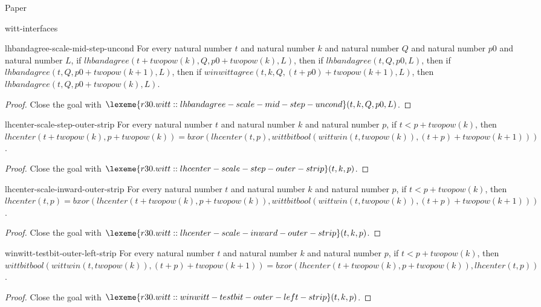 \begin{lexlean}{Paper}
\begin{section}{witt-interfaces}
  \begin{theorem}{lhbandagree-scale-mid-step-uncond}
  For every natural number \(t\) and natural number \(k\) and natural number \(Q\) and natural number \(p0\) and natural number \(L\), if \(lhbandagree(t + twopow(k), Q, p0 + twopow(k), L)\), then if \(lhbandagree(t, Q, p0, L)\), then if \(lhbandagree(t, Q, p0 + twopow(k + 1), L)\), then if \(winwittagree(t, k, Q, (t + p0) + twopow(k + 1), L)\), then \(lhbandagree(t, Q, p0 + twopow(k), L)\).
  \begin{proof}
  Close the goal with \(\lexeme{r30.witt::lhbandagree-scale-mid-step-uncond}(t, k, Q, p0, L)\).
  \end{proof}
  \end{theorem}

  \begin{theorem}{lhcenter-scale-step-outer-strip}
  For every natural number \(t\) and natural number \(k\) and natural number \(p\), if \(t < p + twopow(k)\), then \(lhcenter(t + twopow(k), p + twopow(k)) = bxor(lhcenter(t, p), wittbitbool(wittwin(t, twopow(k)), (t + p) + twopow(k + 1)))\).
  \begin{proof}
  Close the goal with \(\lexeme{r30.witt::lhcenter-scale-step-outer-strip}(t, k, p)\).
  \end{proof}
  \end{theorem}

  \begin{theorem}{lhcenter-scale-inward-outer-strip}
  For every natural number \(t\) and natural number \(k\) and natural number \(p\), if \(t < p + twopow(k)\), then \(lhcenter(t, p) = bxor(lhcenter(t + twopow(k), p + twopow(k)), wittbitbool(wittwin(t, twopow(k)), (t + p) + twopow(k + 1)))\).
  \begin{proof}
  Close the goal with \(\lexeme{r30.witt::lhcenter-scale-inward-outer-strip}(t, k, p)\).
  \end{proof}
  \end{theorem}

  \begin{theorem}{winwitt-testbit-outer-left-strip}
  For every natural number \(t\) and natural number \(k\) and natural number \(p\), if \(t < p + twopow(k)\), then \(wittbitbool(wittwin(t, twopow(k)), (t + p) + twopow(k + 1)) = bxor(lhcenter(t + twopow(k), p + twopow(k)), lhcenter(t, p))\).
  \begin{proof}
  Close the goal with \(\lexeme{r30.witt::winwitt-testbit-outer-left-strip}(t, k, p)\).
  \end{proof}
  \end{theorem}


\end{section}
\end{lexlean}
